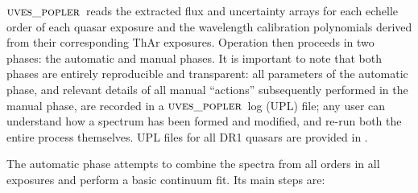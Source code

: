 \documentclass[fleqn,usenatbib,usedcolumn]{mnras}
\newcommand{\popler}{\ensuremath{\textsc{uves\_popler}}}
\begin{document}
\popler\ reads the extracted flux and uncertainty arrays for each echelle order of each quasar exposure and the wavelength calibration polynomials derived from their corresponding ThAr exposures. Operation then proceeds in two phases: the automatic and manual phases. It is important to note that both phases are entirely reproducible and transparent: all parameters of the automatic phase, and relevant details of all manual ``actions'' subsequently performed in the manual phase, are recorded in a \popler\ log (UPL) file; any user can understand how a spectrum has been formed and modified, and re-run both the entire process themselves. UPL files for all DR1 quasars are provided in \citet{Murphy:2018:UVESSQUADDR1}.

The automatic phase attempts to combine the spectra from all orders in all exposures and perform a basic continuum fit. Its main steps are:
\end{document}
